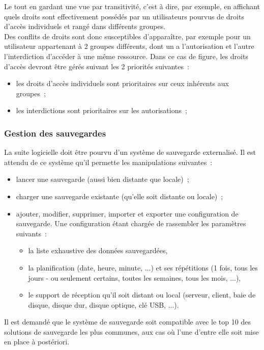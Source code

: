 Le tout en gardant une vue par transitivité, c'est à dire, par exemple, en affichant quels droits sont effectivement possédés par un utilisateurs pourvus de droits d'accès individuels et rangé dans différents groupes.
\\
Des conflits de droits sont donc susceptibles d'apparaître, par exemple pour un utilisateur appartenant à 2 groupes différents, dont un a l'autorisation et l'autre l'interdiction d'accéder à une même ressource. Dans ce cas de figure, les droits d'accès devront être gérés suivant les 2 priorités suivantes~:
\begin{itemize}
	\item les droits d'accès individuels sont prioritaires sur ceux inhérents aux groupes~;
	\item les interdictions sont prioritaires sur les autorisations~;
\end{itemize}

\subsubsection{Gestion des sauvegardes}
La suite logicielle doit être pourvu d'un système de sauvegarde externalisé. Il est attendu de ce système qu'il permette les manipulations suivantes~:
\begin{itemize}
	\item lancer une sauvegarde (aussi bien distante que locale)~;
	\item charger une sauvegarde existante (qu'elle soit distante ou locale)~;
	\item ajouter, modifier, supprimer, importer et exporter une configuration de sauvegarde. Une configuration étant chargée de rassembler les paramètres suivants~:
	\begin{itemize}
		\item la liste exhaustive des données sauvegardées,
		\item la planification (date, heure, minute, ...) et ses répétitions (1 fois, tous les jours - ou seulement certains, toutes les semaines, tous les mois, ...),
		\item le support de réception qu'il soit distant ou local (serveur, client, baie de disque, disque dur, disque optique, clé USB, ...).
	\end{itemize}
\end{itemize}
\begin{constraint}
Il est demandé que le système de sauvegarde soit compatible avec le top 10 des solutions de sauvegarde les plus communes, aux cas où l'une d'entre elle soit mise en place à postériori.
\end{constraint}

